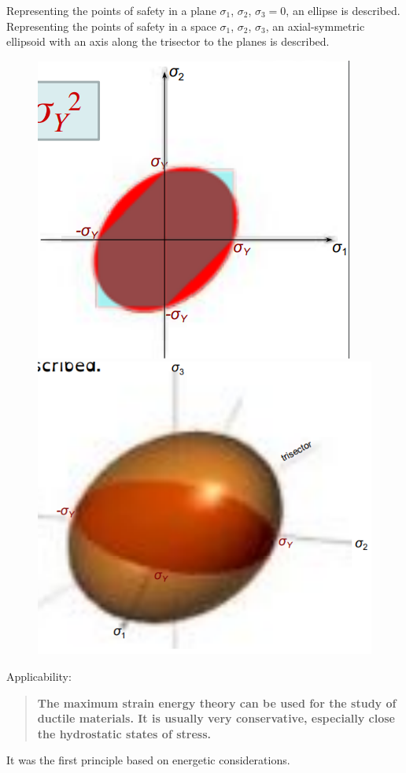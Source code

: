 \documentclass[class=report, crop=false, 12pt,a4paper]{standalone}
\begin{document}
Representing the points of safety in a plane $\sigma_1$, $\sigma_2$, $\sigma_3 = 0$, an ellipse is described. Representing the points of safety in a space $\sigma_1$, $\sigma_2$, $\sigma_3$, an axial-symmetric ellipsoid with an axis along the trisector to the planes is described.
\begin{figure}
  \begin{center}
    \begin{minipage}[b]{0.46\textwidth}
      \centering
      \includegraphics[width = \textwidth]{../img/diagram29.png}
      \caption{}
    \end{minipage}
    \begin{minipage}[b]{0.46\textwidth}
      \centering
      \includegraphics[width = \textwidth]{../img/diagram30.png}
      \caption{}
    \end{minipage}
  \end{center}
\end{figure}
Applicability:
\begin{quotation}
  \textbf{The maximum strain energy theory can be used for the study of ductile materials. It is usually very conservative, especially close the hydrostatic states of stress.}
\end{quotation}
It was the first principle based on energetic considerations.
\end{document}

